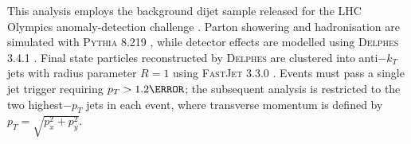             This analysis employs the background dijet sample released for the LHC Olympics anomaly-detection challenge \cite{Kasieczka:2021xcg,kasieczka_rd_2019}.
            Parton showering and hadronisation are simulated with \textsc{Pythia} 8.219 \cite{Sjostrand:2007gs}, while detector effects are modelled using \textsc{Delphes} 3.4.1 \cite{DeFavereau2014DELPHESExperiment,Mertens:2015kba}.
            Final state particles reconstructed by \textsc{Delphes} are clustered into anti$-k_T$ jets with radius parameter $R=1$ using \textsc{FastJet} 3.3.0 \cite{Cacciari:2008gp,Cacciari2008TheAlgorithm,Cacciari2012FastJetManual}.
            Events must pass a single jet trigger requiring $p_T>\num{1.2}{\TeV}$;
            the subsequent analysis is restricted to the two highest$-p_T$ jets in each event, where transverse momentum is defined by $p_T=\sqrt{p_x^{2}+p_y^{2}}$.
